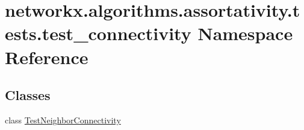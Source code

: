 \hypertarget{namespacenetworkx_1_1algorithms_1_1assortativity_1_1tests_1_1test__connectivity}{}\section{networkx.\+algorithms.\+assortativity.\+tests.\+test\+\_\+connectivity Namespace Reference}
\label{namespacenetworkx_1_1algorithms_1_1assortativity_1_1tests_1_1test__connectivity}
\subsection*{Classes}
\begin{DoxyCompactItemize}
\item 
class \hyperlink{classnetworkx_1_1algorithms_1_1assortativity_1_1tests_1_1test__connectivity_1_1TestNeighborConnectivity}{Test\+Neighbor\+Connectivity}
\end{DoxyCompactItemize}
